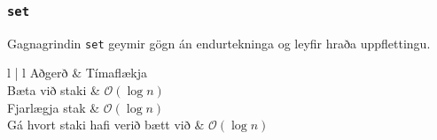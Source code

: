{
}

{
	\frametitle{\texttt{set}}
	{
		\item<1-> Gagnagrindin \texttt{set} geymir gögn án endurtekninga og leyfir hraða uppflettingu.
		\item<2->[]
		{
			{l | l}
			Aðgerð & Tímaflækja\\
			\hline
			Bæta við staki & $\mathcal{O}(\log n)$\\
			Fjarlægja stak & $\mathcal{O}(\log n)$\\
			Gá hvort staki hafi verið bætt við  & $\mathcal{O}(\log n)$\\
		}
	}
}

{
}

{
}


